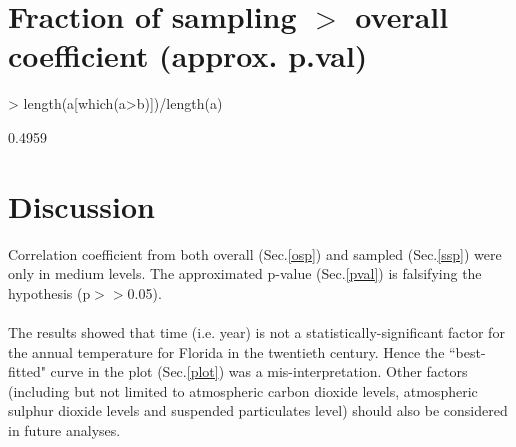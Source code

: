 \documentclass{article}
\begin{document}
\section{Fraction of sampling $>$ overall coefficient (approx. p.val)\label{pval}}
\begin{Schunk}
\begin{Sinput}
> length(a[which(a>b)])/length(a)
\end{Sinput}
\begin{Soutput}
[1] 0.4959
\end{Soutput}
\end{Schunk}
\section{Discussion}
Correlation coefficient from both overall (Sec.\ref{osp}) and sampled (Sec.\ref{ssp}) were only in medium levels.  The approximated p-value (Sec.\ref{pval}) is falsifying the hypothesis (p$>>$0.05).\\\\
The results showed that time (i.e. year) is not a statistically-significant factor for the annual temperature for Florida in the twentieth century.  Hence the ``best-fitted" curve in the plot (Sec.\ref{plot}) was a mis-interpretation.  Other factors (including but not limited to atmospheric carbon dioxide levels, atmospheric sulphur dioxide levels and suspended particulates level) should also be considered in future analyses.
\end{document}
